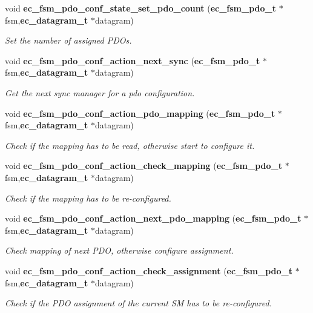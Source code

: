 \begin{DoxyCompactItemize}
void {\bf ec\-\_\-fsm\-\_\-pdo\-\_\-conf\-\_\-state\-\_\-set\-\_\-pdo\-\_\-count} ({\bf ec\-\_\-fsm\-\_\-pdo\-\_\-t} $\ast$fsm,{\bf ec\-\_\-datagram\-\_\-t} $\ast$datagram)
\begin{DoxyCompactList}\small\item\em Set the number of assigned P\-D\-Os. \end{DoxyCompactList}\item 
void {\bf ec\-\_\-fsm\-\_\-pdo\-\_\-conf\-\_\-action\-\_\-next\-\_\-sync} ({\bf ec\-\_\-fsm\-\_\-pdo\-\_\-t} $\ast$fsm,{\bf ec\-\_\-datagram\-\_\-t} $\ast$datagram)
\begin{DoxyCompactList}\small\item\em Get the next sync manager for a pdo configuration. \end{DoxyCompactList}\item 
void {\bf ec\-\_\-fsm\-\_\-pdo\-\_\-conf\-\_\-action\-\_\-pdo\-\_\-mapping} ({\bf ec\-\_\-fsm\-\_\-pdo\-\_\-t} $\ast$fsm,{\bf ec\-\_\-datagram\-\_\-t} $\ast$datagram)
\begin{DoxyCompactList}\small\item\em Check if the mapping has to be read, otherwise start to configure it. \end{DoxyCompactList}\item 
void {\bf ec\-\_\-fsm\-\_\-pdo\-\_\-conf\-\_\-action\-\_\-check\-\_\-mapping} ({\bf ec\-\_\-fsm\-\_\-pdo\-\_\-t} $\ast$fsm,{\bf ec\-\_\-datagram\-\_\-t} $\ast$datagram)
\begin{DoxyCompactList}\small\item\em Check if the mapping has to be re-\/configured. \end{DoxyCompactList}\item 
void {\bf ec\-\_\-fsm\-\_\-pdo\-\_\-conf\-\_\-action\-\_\-next\-\_\-pdo\-\_\-mapping} ({\bf ec\-\_\-fsm\-\_\-pdo\-\_\-t} $\ast$fsm,{\bf ec\-\_\-datagram\-\_\-t} $\ast$datagram)
\begin{DoxyCompactList}\small\item\em Check mapping of next P\-D\-O, otherwise configure assignment. \end{DoxyCompactList}\item 
void {\bf ec\-\_\-fsm\-\_\-pdo\-\_\-conf\-\_\-action\-\_\-check\-\_\-assignment} ({\bf ec\-\_\-fsm\-\_\-pdo\-\_\-t} $\ast$fsm,{\bf ec\-\_\-datagram\-\_\-t} $\ast$datagram)
\begin{DoxyCompactList}\small\item\em Check if the P\-D\-O assignment of the current S\-M has to be re-\/configured. \end{DoxyCompactList}\item 

\end{DoxyCompactItemize}
